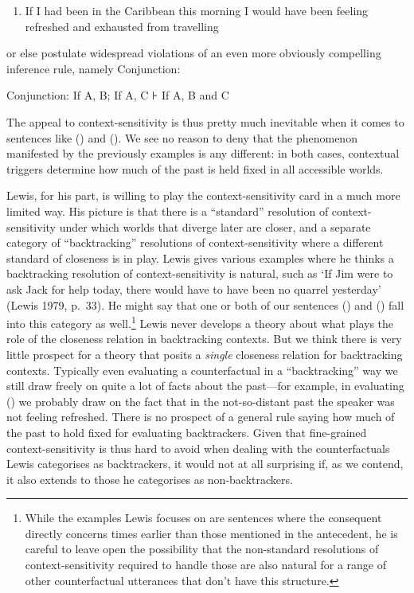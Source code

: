 \begin{enumerate}
\def\labelenumi{(\arabic{enumi})}
\setcounter{enumi}{49}
\itemsep1pt\parskip0pt
\item
  If I had been in the Caribbean this morning I would have been feeling
  refreshed and exhausted from travelling
\end{enumerate}

or else postulate widespread violations of an even more obviously
compelling inference rule, namely Conjunction:

Conjunction: If A, B; If A, C ⊦ If A, B and C

The appeal to context-sensitivity is thus pretty much inevitable when it
comes to sentences like () and (). We see no reason to deny that the
phenomenon manifested by the previously examples is any different: in
both cases, contextual triggers determine how much of the past is held
fixed in all accessible worlds.

Lewis, for his part, is willing to play the context-sensitivity card in
a much more limited way. His picture is that there is a ``standard''
resolution of context-sensitivity under which worlds that diverge later
are closer, and a separate category of ``backtracking'' resolutions of
context-sensitivity where a different standard of closeness is in play.
Lewis gives various examples where he thinks a backtracking resolution
of context-sensitivity is natural, such as `If Jim were to ask Jack for
help today, there would have to have been no quarrel yesterday' (Lewis
1979, p.~33). He might say that one or both of our sentences () and ()
fall into this category as well.\footnote{While the examples Lewis
  focuses on are sentences where the consequent directly concerns times
  earlier than those mentioned in the antecedent, he is careful to leave
  open the possibility that the non-standard resolutions of
  context-sensitivity required to handle those are also natural for a
  range of other counterfactual utterances that don't have this
  structure.} Lewis never develops a theory about what plays the role of
the closeness relation in backtracking contexts. But we think there is
very little prospect for a theory that posits a \emph{single} closeness
relation for backtracking contexts. Typically even evaluating a
counterfactual in a ``backtracking'' way we still draw freely on quite a
lot of facts about the past---for example, in evaluating () we probably
draw on the fact that in the not-so-distant past the speaker was not
feeling refreshed. There is no prospect of a general rule saying how
much of the past to hold fixed for evaluating backtrackers. Given that
fine-grained context-sensitivity is thus hard to avoid when dealing with
the counterfactuals Lewis categorises as backtrackers, it would not at
all surprising if, as we contend, it also extends to those he
categorises as non-backtrackers.

